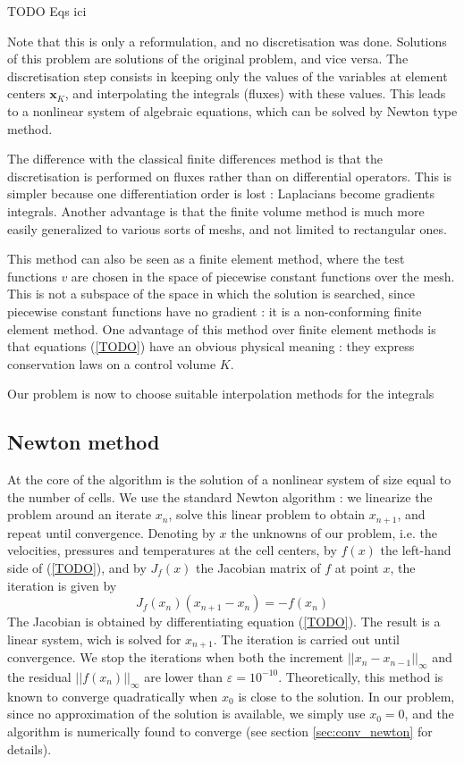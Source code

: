 \documentclass[12pt]{article}
\newcommand{\vb}[1]{\ensuremath{\mathbf{#1}}}
\begin{document}
TODO Eqs ici

Note that this is only a reformulation, and no discretisation was
done. Solutions of this problem are solutions of the original problem,
and vice versa. The discretisation step consists in keeping only the
values of the variables at element centers $\vb{x}_K$, and
interpolating the integrals (fluxes) with these values. This leads to
a nonlinear system of algebraic equations, which can be solved by
Newton type method.

The difference with the classical finite differences method is that
the discretisation is performed on fluxes rather than on differential
operators. This is simpler because one differentiation order is lost :
Laplacians become gradients integrals. Another advantage is that the
finite volume method is much more easily generalized to various sorts
of meshs, and not limited to rectangular ones.

This method can also be seen as a finite element method, where the
test functions $v$ are chosen in the space of piecewise constant
functions over the mesh. This is not a subspace of the space in which
the solution is searched, since piecewise constant functions have no
gradient : it is a non-conforming finite element method. One advantage
of this method over finite element methods is that equations
(\ref{TODO}) have an obvious physical meaning : they express
conservation laws on a control volume $K$.

Our problem is now to choose suitable interpolation methods for the
integrals
\subsection{Newton method}
At the core of the algorithm is the solution of a nonlinear system of
size equal to the number of cells. We use the standard Newton
algorithm : we linearize the problem around an iterate $x_n$, solve
this linear problem to obtain $x_{n+1}$, and repeat until
convergence. Denoting by $x$ the unknowns of our problem, i.e. the
velocities, pressures and temperatures at the cell centers, by $f(x)$
the left-hand side of (\ref{TODO}), and by $J_f(x)$ the Jacobian
matrix of $f$ at point $x$, the iteration is given by
\begin{equation}
  \label{eq:newton}
  J_f(x_n) (x_{n+1} - x_n) = - f(x_n)
\end{equation}
The Jacobian is obtained by differentiating equation (\ref{TODO}). The
result is a linear system, wich is solved for $x_{n+1}$. The iteration
is carried out until convergence. We stop the iterations when both the
increment $||x_{n} - x_{n-1}||_\infty$ and the residual
$||f(x_n)||_\infty$ are lower than $\varepsilon =
10^{-10}$. Theoretically, this method is known to converge
quadratically when $x_0$ is close to the solution. In our problem,
since no approximation of the solution is available, we simply use
$x_0 = 0$, and the algorithm is numerically found to converge (see
section \ref{sec:conv_newton} for details).
\end{document}
